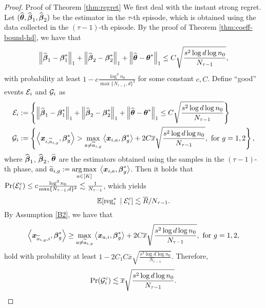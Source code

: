 \begin{proof}{Proof of Theorem \ref{thm:regret}}
We first deal with the instant strong regret. Let $(\widehat{\boldsymbol{\theta}}, \widehat{\boldsymbol{\beta}}_{1}, \widehat{\boldsymbol{\beta}}_{2})$ be the estimator in the $\tau$-th episode, which is obtained using the data collected in the $(\tau-1)$-th episode. By the proof of Theorem \ref{thm:coeff-bound-hd}, we have that 
	\[
	\left\lVert\widehat{\boldsymbol{\beta}}_{1} - \boldsymbol{\beta}_{1}^*\right\rVert_1 + \left\lVert\widehat{\boldsymbol{\beta}}_{2} - \boldsymbol{\beta}_{2}^*\right\rVert_1 + \left\lVert\widehat{\boldsymbol{\theta}} - \boldsymbol{\theta}^*\right\rVert_1
	\leq C
	\sqrt{\frac{s^2\log d \log n_0}{N_{\tau-1}}},
	\]
	with probability at least $1-c \frac{\log^3 n_0}{\max\{N_{\tau-1}, d\}^2}$ for some constant $c, C$.
Define ``good'' events ${\cal E}_i$ and ${\cal G}_i$ as
	\begin{align*}
		{\cal E}_i& := \left\{ \left\lVert\widehat{\boldsymbol{\beta}}_{1} - \boldsymbol{\beta}_{1}^*\right\rVert_{1} + \left\lVert\widehat{\boldsymbol{\beta}}_{2} - \boldsymbol{\beta}_{2}^*\right\rVert_{1} + \left\lVert\widehat{\boldsymbol{\theta}} - \boldsymbol{\theta}^*\right\rVert_{1}
		\leq C
		\sqrt{\frac{s^2\log d \log n_0}{N_{\tau-1}}}\right\}\\
			{\cal G}_i&:=\left\{\left\langle \boldsymbol{x}_{i, \widetilde{a}_{i, g}}, \boldsymbol{\beta}_g^* \right\rangle > \max_{a\ne \widetilde{a}_{i, g}}\left\langle \boldsymbol{x}_{i, a}, \boldsymbol{\beta}^*_{g} \right\rangle + 2C\overline{x}\sqrt{\frac{s^2\log d  \log n_0}{N_{\tau-1}}}, \text{ for } g= 1, 2 \right\},
	\end{align*}
	where $\widehat{\boldsymbol{\beta}}_{1}$, $\widehat{\boldsymbol{\beta}}_{2}$, $\widehat{\boldsymbol{\theta}}$ are the estimators obtained using the samples in the $(\tau-1)$-th phase, and $\widetilde{a}_{i, g}:=\underset{a\in [K]}{\arg \max}\; \left\langle \boldsymbol{x}_{i,a}, \boldsymbol{\beta}^*_g \right\rangle$.  Then it holds that $\Pr({\cal E}_i^c) \leq c \frac{\log^3 n_0}{\max\{N_{\tau-1}, d\}^2}  \lesssim  \frac{1}{N_{\tau-1}}$, which yields
	\begin{equation}\label{eq:Eec-strong}
		\mathbb{E}[\operatorname{reg}^*_i \;|\; {\cal E}_i^c] \lesssim \overline{R}/N_{\tau-1}.
	\end{equation}%
 By Assumption \ref{B2}, we have that
	\[\left\langle \boldsymbol{x}_{\widetilde{a}_{i, g}, i}, \boldsymbol{\beta}_g^* \right\rangle \ge \max_{a\ne \widetilde{a}_{i, g}}\left\langle \boldsymbol{x}_{a, i}, \boldsymbol{\beta}^*_{g} \right\rangle + 2C\overline{x}\sqrt{\frac{s^2\log d  \log n_0}{N_{\tau-1}}}, \text{ for } g= 1, 2,\]
	hold with probability at least $1-2C_1C\overline{x}\sqrt{\frac{s^2\log d  \log n_0}{N_{\tau-1}}}$. Therefore,
	\[
	\Pr({\cal G}_i^c) \lesssim \overline{x}\sqrt{\frac{s^2\log d  \log n_0}{N_{\tau-1}}}.
	\]


\end{proof}
